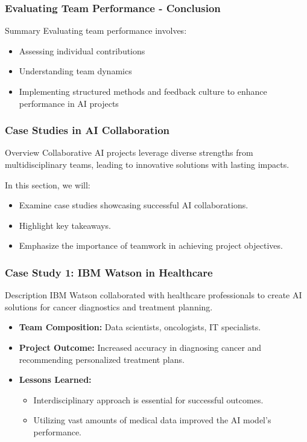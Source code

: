 \documentclass[aspectratio=169]{beamer}
\begin{document}
\begin{frame}[fragile]
    \frametitle{Evaluating Team Performance - Conclusion}
    \begin{block}{Summary}
        Evaluating team performance involves:
        \begin{itemize}
            \item Assessing individual contributions
            \item Understanding team dynamics
            \item Implementing structured methods and feedback culture to enhance performance in AI projects
        \end{itemize}
    \end{block}
\end{frame}

\begin{frame}[fragile]
    \frametitle{Case Studies in AI Collaboration}
    \begin{block}{Overview}
        Collaborative AI projects leverage diverse strengths from multidisciplinary teams, leading to innovative solutions with lasting impacts. 
    \end{block}
    In this section, we will:
    \begin{itemize}
        \item Examine case studies showcasing successful AI collaborations.
        \item Highlight key takeaways.
        \item Emphasize the importance of teamwork in achieving project objectives.
    \end{itemize}
\end{frame}

\begin{frame}[fragile]
    \frametitle{Case Study 1: IBM Watson in Healthcare}
    \begin{block}{Description}
        IBM Watson collaborated with healthcare professionals to create AI solutions for cancer diagnostics and treatment planning.
    \end{block}
    \begin{itemize}
        \item \textbf{Team Composition:} Data scientists, oncologists, IT specialists.
        \item \textbf{Project Outcome:} Increased accuracy in diagnosing cancer and recommending personalized treatment plans.
        \item \textbf{Lessons Learned:}
        \begin{itemize}
            \item Interdisciplinary approach is essential for successful outcomes.
            \item Utilizing vast amounts of medical data improved the AI model's performance.
        \end{itemize}
    \end{itemize}
\end{frame}
\end{document}
